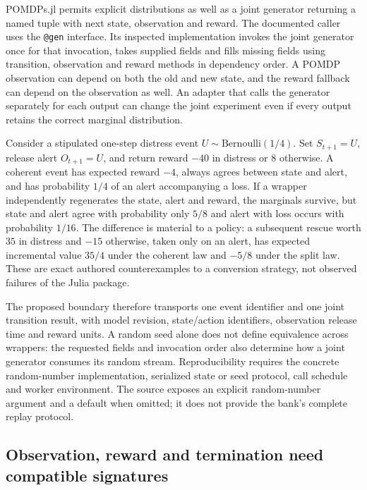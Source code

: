 POMDPs.jl permits explicit distributions as well as a joint generator returning
a named tuple with next state, observation and reward. The documented caller
uses the \texttt{@gen} interface. Its inspected implementation invokes the
joint generator once for that invocation, takes supplied fields and fills
missing fields using transition, observation and reward methods in dependency
order. A POMDP observation can depend on both the old and new state, and the
reward fallback can depend on the observation as well. An adapter that calls
the generator separately for each output can change the joint experiment even
if every output retains the correct marginal distribution.
\citep{exec23_pomdpsjl_sources}

Consider a stipulated one-step distress event $U\sim\mathrm{Bernoulli}(1/4)$.
Set $S_{t+1}=U$, release alert $O_{t+1}=U$, and return reward $-40$ in distress
or $8$ otherwise. A coherent event has expected reward $-4$, always agrees
between state and alert, and has probability $1/4$ of an alert accompanying a
loss. If a wrapper independently regenerates the state, alert and reward,
the marginals survive, but state and alert agree with probability only $5/8$
and alert with loss occurs with probability $1/16$. The difference is material
to a policy: a subsequent rescue worth $35$ in distress and $-15$ otherwise,
taken only on an alert, has expected incremental value $35/4$ under the coherent
law and $-5/8$ under the split law. These are exact authored counterexamples
to a conversion strategy, not observed failures of the Julia package.
\citep{exec23_pomdpsjl_reference}

The proposed boundary therefore transports one event identifier and one
joint transition result, with model revision, state/action identifiers,
observation release time and reward units. A random seed alone does not define
equivalence across wrappers: the requested fields and invocation order also
determine how a joint generator consumes its random stream. Reproducibility
requires the concrete random-number implementation, serialized state or seed
protocol, call schedule and worker environment. The source exposes an explicit
random-number argument and a default when omitted; it does not provide the
bank's complete replay protocol.
\citep{exec23_pomdpsjl_sources}

\subsection{Observation, reward and termination need compatible signatures}
\label{exec23:pomdpsjl-contracts}

